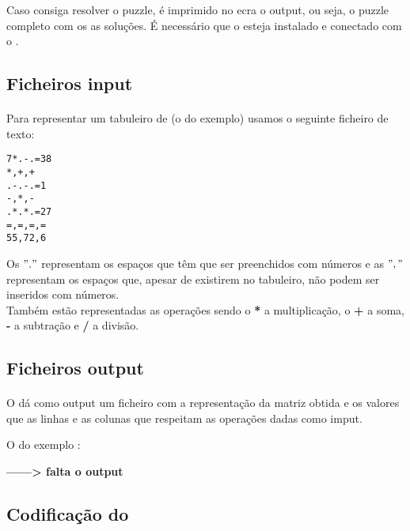 \documentclass{article}
\begin{document}
Caso consiga resolver o puzzle, é imprimido no ecra o output, ou seja, o puzzle completo com os as soluções. É necessário que o {} esteja instalado e conectado com o {}.

\subsection{Ficheiros input}

\paragraph{} 

Para representar um tabuleiro de {} (o do exemplo) usamos o seguinte ficheiro de texto:
\begin{center}
\begin{verbatim}
7*.-.=38
*,+,+
.-.-.=1
-,*,-
.*.*.=27
=,=,=,=
55,72,6
\end{verbatim}
\end{center}

Os $"."$ representam os espaços que têm que ser preenchidos com números e as $","$ representam os espaços que, apesar de existirem no tabuleiro, não podem ser inseridos com números. 
\\

Também estão representadas as operações sendo o {\bf{*}} a multiplicação, o  {\bf{+}} a soma, {\bf{-}} a subtração e {\bf{/}} a divisão. 

\subsection{Ficheiros output}
\paragraph{} 
O {} dá como output um ficheiro com a representação da matriz obtida e os valores que as linhas e as colunas que respeitam as operações dadas como imput.


O do exemplo :
\begin{center}
{\bf{------> falta o output}}
\end{center}

\subsection{Codificação do {}}
\end{document}
